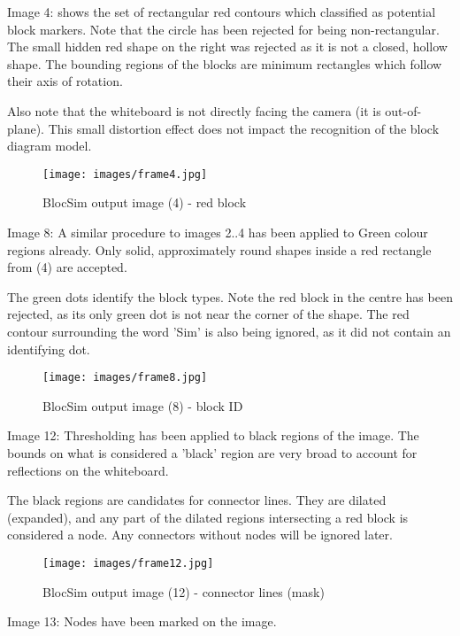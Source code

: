 \newpage
Image 4: shows the set of rectangular red contours which classified as potential block markers. Note that the circle has been rejected for being non-rectangular. The small hidden red shape on the right was rejected as it is not a closed, hollow shape. The bounding regions of the blocks are minimum rectangles which follow their axis of rotation. 

Also note that the whiteboard is not directly facing the camera (it is out-of-plane). This small distortion effect does not impact the recognition of the block diagram model.

\begin{figure}[ht!]
\centering
\texttt{[image: images/frame4.jpg]}
\caption{BlocSim output image (4) - red block \cite{blocsim}}
\label{im:frame4}
\end{figure}

\newpage
Image 8: A similar procedure to images 2..4 has been applied to Green colour regions already. Only solid, approximately round shapes inside a red rectangle from (4) are accepted.

The green dots identify the block types. Note the red block in the centre has been rejected, as its only green dot is not near the corner of the shape. The red contour surrounding the word 'Sim' is also being ignored, as it did not contain an identifying dot.

\begin{figure}[ht!]
\centering
\texttt{[image: images/frame8.jpg]}
\caption{BlocSim output image (8) - block ID \cite{blocsim}}
\label{im:frame8}
\end{figure}

\newpage
Image 12: Thresholding has been applied to black regions of the image. The bounds on what is considered a 'black' region are very broad to account for reflections on the whiteboard. 

The black regions are candidates for connector lines. They are dilated (expanded), and any part of the dilated regions intersecting a red block is considered a node. Any connectors without nodes will be ignored later.

\begin{figure}[ht!]
\centering
\texttt{[image: images/frame12.jpg]}
\caption{BlocSim output image (12) - connector lines (mask) \cite{blocsim}}
\label{im:frame12}
\end{figure}

\newpage
Image 13: Nodes have been marked on the image.

